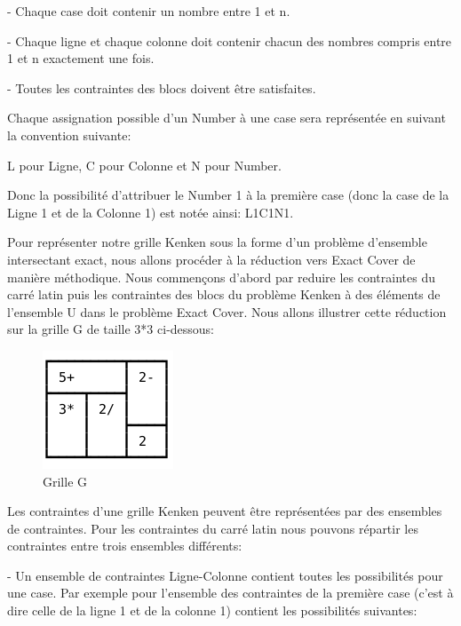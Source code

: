 \documentclass[1]{report}
\begin{document}
    - Chaque case doit contenir un nombre entre 1 et n.
    
    - Chaque ligne et chaque colonne doit contenir chacun des nombres compris entre 1 et n exactement une fois.
    
    - Toutes les contraintes des blocs doivent être satisfaites. \newline
    
	Chaque assignation possible d'un Number à une case sera représentée en suivant la convention suivante:
	
	L pour Ligne, C pour Colonne et N pour Number. 
	
	Donc la possibilité d'attribuer le Number 1 à la première case (donc la case de la Ligne 1 et de la Colonne 1) est notée ainsi: L1C1N1. \newline
	
    Pour représenter notre grille Kenken sous la forme  d'un problème d'ensemble intersectant exact, nous allons procéder à la réduction vers Exact Cover de manière méthodique. Nous commençons d'abord par reduire les contraintes du carré latin puis les contraintes des blocs du problème Kenken à des éléments de l'ensemble U dans le problème Exact Cover. Nous allons illustrer cette réduction sur la grille G de taille 3*3 ci-dessous: \newline

    \begin{figure}[h]
        \centering
            \includegraphics[scale=0.9]{kenekn3.png}
            \caption{Grille G}
    \end{figure}
    
    Les contraintes d'une grille Kenken peuvent être représentées par des ensembles de contraintes. Pour les contraintes du carré latin nous pouvons répartir les contraintes entre trois ensembles différents: \newline
    
    - Un ensemble de contraintes Ligne-Colonne contient toutes les possibilités pour une case. Par exemple pour l'ensemble des contraintes de la première case (c'est à dire celle de la ligne 1 et de la colonne 1) contient les possibilités suivantes:
    
\end{document}

